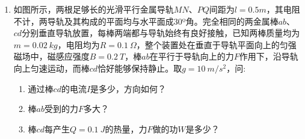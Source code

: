 \begin{enumerate}
\item 
{}
如图所示，两根足够长的光滑平行金属导轨$ MN $、$ PQ $间距为$ l=0.5m $，其电阻不计，两导轨及其构成的平面均与水平面成$ 30 $º角。完全相同的两金属棒$ ab $、$ cd $分别垂直导轨放置，每棒两端都与导轨始终有良好接触，已知两棒质量均为$ m=0.02 \ kg $，电阻均为$ R=0.1\ \Omega $，整个装置处在垂直于导轨平面向上的匀强磁场中，磁感应强度$ B=0.2 \ T $，棒$ ab $在平行于导轨向上的力$ F $作用下，沿导轨向上匀速运动，而棒$ cd $恰好能够保持静止。取$ g=10 \ m/s ^{2} $，问:
\begin{enumerate}
\renewcommand{\labelenumi}{\arabic{enumi}.}
\item
通过棒$ cd $的电流$ I $是多少，方向如何？
\item 
棒$ ab $受到的力$ F $多大？
\item 
棒$ cd $每产生$ Q=0.1\ J $的热量，力$ F $做的功$ W $是多少？



\end{enumerate}

\begin{figure}[h!]
\flushright

\end{figure}






\end{enumerate}
